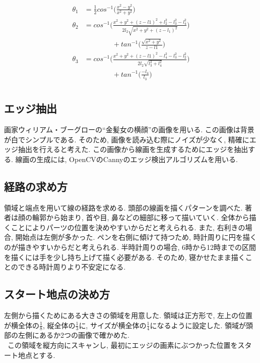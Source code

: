 \documentclass[10pt]{jarticle}
\begin{document}
	\begin{equation}
		\begin{array}{c}
			\begin{split}
				\theta_1  &  =\frac{1}{2}  cos^{-1}\biggl( \frac{x^2-y^2}{x^2+y^2} \biggr) \\
				\theta_2  &  = cos^{-1}\biggl( \frac{x^2+y^2+(z-l1)^2  +  l_2^2-l_3^2-l_4^2}{2l_2\sqrt{x^2+y^2+(z-l_1)^2}} \biggr)\\
				&\qquad\qquad  +  tan^{-1}\biggl( \frac{\sqrt{x^2+y^2}}{z-l1}\biggr) \\
				\theta_3  &  =cos^{-1}\biggl( \frac{x^2+y^2+(z-l1)^2 - l_4^2-l_3^2-l_2^2}{2l_2\sqrt{l_3^2+l_4^2}}\biggr)\\
				&\qquad\qquad + tan^{-1}\biggl( \frac{-l_4}{l_3}\biggr)\\
			\end{split}
		\end{array}
	\end{equation}
	
	\normalsize

	\subsection{エッジ抽出}
	画家ウィリアム・ブーグローの``金髪女の横顔''の画像を用いる.
	この画像は背景が白でシンプルである. そのため, 画像を読み込む際にノイズが少なく, 精確にエッジ抽出を行えると考えた.
	この画像から線画を生成するためにエッジを抽出する.
	線画の生成には, OpenCVのCannyのエッジ検出アルゴリズムを用いる.	
	
	\subsection{経路の求め方}
	領域と端点を用いて線の経路を求める.
	頭部の線画を描くパターンを調べた.
	著者は顔の輪郭から始まり, 首や目, 鼻などの細部に移って描いていく.
	全体から描くことによりパーツの位置を決めやすいからだと考えられる.
	また, 右利きの場合, 開始点は左側が多かった.
	ペンを右側に傾けて持つため, 時計周りに円を描くのが描きやすいからだと考えられる.
	半時計周りの場合, 6時から12時までの区間を描くには手を少し持ち上げて描く必要がある.
    そのため, 寝かせたまま描くことのできる時計周りより不安定になる.
	
	\subsection{スタート地点の決め方}
	左側から描くためにある大きさの領域を用意した.
	領域は正方形で, 左上の位置が横全体の$\frac{1}{8}$, 縦全体の$\frac{1}{3}$に, サイズが横全体の$\frac{1}{4}$になるように設定した.
	領域が頭部の左側にあるか2つの画像で確かめた.
	\\\ この領域を縦方向にスキャンし, 最初にエッジの画素にぶつかった位置をスタート地点とする.
\end{document}
